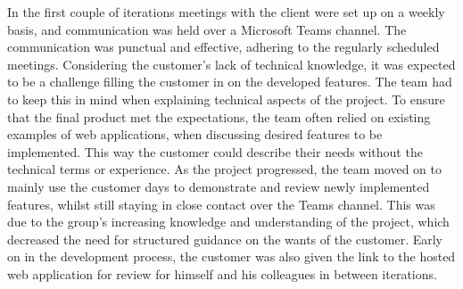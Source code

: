 \documentclass{l3proj}
\begin{document}
In the first couple of iterations meetings with the client were set up on a weekly basis, and communication was held over a Microsoft Teams channel. The communication was punctual and effective, adhering to the regularly scheduled meetings. Considering the customer's lack of technical knowledge, it was expected to be a challenge filling the customer in on the developed features. The team had to keep this in mind when explaining technical aspects of the project. To ensure that the final product met the expectations, the team often relied on existing examples of web applications, when discussing desired features to be implemented. This way the customer could describe their needs without the technical terms or experience. As the project progressed, the team moved on to mainly use the customer days to demonstrate and review newly implemented features, whilst still staying in close contact over the Teams channel. This was due to the group's increasing knowledge and understanding of the project, which decreased the need for structured guidance on the wants of the customer. Early on in the development process, the customer was also given the link to the hosted web application for review for himself and his colleagues in between iterations.
\end{document}
